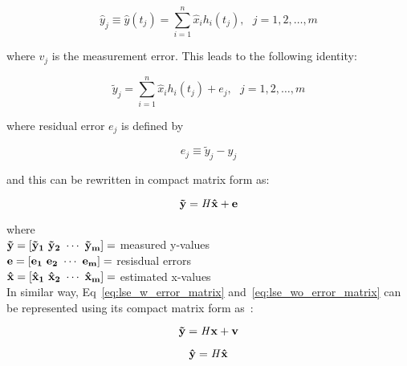 \begin{equation}
    \hat{y}_{j} \equiv \hat{y}(t_{j}) = \sum_{i = 1}^{n}{\hat{x}_{i} h_{i}(t_{j})},~~~j = 1, 2, \ldots, m
    \label{eq:lse_wo_error}
\end{equation}

where $v_{j}$ is the measurement error. This leads to the following identity:

\begin{equation}
    \tilde{y}_{j} = \sum_{i = 1}^{n}{\hat{x}_{i} h_{i}(t_{j}) + e_{j}},~~~j = 1, 2, \ldots, m
    \label{eq:lse_w_rerror}
\end{equation}

where residual error $e_{j}$ is defined by

\begin{equation}
    e_{j} \equiv \tilde{y}_{j} - \hat{y}_{j}
    \label{eq:residual_error}
\end{equation}

and this can be rewritten in compact matrix form as:

\begin{equation}
    \bf{\tilde{y}} = \bf{\it{H}} \bf{\hat{x}} + \bf{e}
\end{equation}

where ~\cite{crassidis2004dynamic} \\

$\bf{\tilde{y}} = \left[ \tilde{y}_{1} ~ \tilde{y}_{2} ~ \cdots ~ \tilde{y}_{m} \right] = $ measured y-values \\

$\bf{e} = \left[ e_{1} ~ e_{2} ~ \cdots ~ e_{m} \right] = $ resisdual errors \\

$\bf{\hat{x}} = \left[ \hat{x}_{1} ~ \hat{x}_{2} ~ \cdots ~ \hat{x}_{m} \right] = $ estimated x-values \\

In similar way, Eq~\ref{eq:lse_w_error_matrix} and~\ref{eq:lse_wo_error_matrix} can be represented using its compact matrix form as~\cite{crassidis2004dynamic}:

\begin{equation}
    \bf{\tilde{y}} = \bf{\it{H}} \bf{x} + \bf{v}
    \label{eq:lse_w_error_matrix}
\end{equation}

\begin{equation}
    \bf{\hat{y}} = \bf{\it{H}} \bf{\hat{x}}
    \label{eq:lse_wo_error_matrix}
\end{equation}

